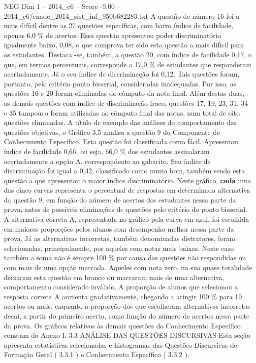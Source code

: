 \begin{textsample}{NEG Dim 1 – 2014\_c6 – Score -9.00 – 2014\_c6/enade\_2014\_sist\_inf\_950b682283.txt}
A questão de número 16 foi a mais difícil dentre as 27 questões específicas, com baixo índice de facilidade, apenas 6,0 \% de acertos.
Essa questão apresentou poder discriminatório igualmente baixo, 0,08, o que comprova ter sido esta questão a mais difícil para os estudantes.
Destaca -se, também, a questão 20, com índice de facilidade 0,17, o que, em termos percentuais, corresponde a 17,0 \% de estudantes que responderam acertadamente.
Já o seu índice de discriminação foi 0,12.
Tais questões foram, portanto, pelo critério ponto bisserial, consideradas inadequadas.
Por isso, as questões 16 e 20 foram eliminadas do cômputo da nota final.
Além destas duas, as demais questões com índice de discriminação fraco, questões 17, 19, 23, 31, 34 e 35 tampouco foram utilizadas no cômputo final das notas, num total de oito questões eliminadas.
A título de exemplo das análises do comportamento das questões objetivas, o Gráfico 3.5 analisa a questão 9 do Componente de Conhecimento Específico.
Esta questão foi classificada como fácil.
Apresentou índice de facilidade 0,66, ou seja, 66,0 \% dos estudantes assinalaram acertadamente a opção A, correspondente ao gabarito.
Seu índice de discriminação foi igual a 0,42, classificado como muito bom, também sendo esta questão a que apresentou o maior índice discriminatório.
Neste gráfico, \textbf{cada} uma das cinco curvas representa o percentual de respostas em determinada alternativa da questão 9, em função do número de acertos dos estudantes nessa parte da prova, antes de possíveis eliminações de questões pelo critério do ponto bisserial.
A alternativa correta A, representada no gráfico pela curva em azul, foi escolhida em maiores proporções pelos alunos com desempenho melhor nessa parte da prova.
Já as alternativas incorretas, também denominadas distratores, foram selecionadas, principalmente, por aqueles com notas mais baixas.
Neste caso também a soma não é sempre 100 \% por causa das questões não respondidas ou com mais de uma opção marcada.
Aqueles com nota zero, na sua quase totalidade deixaram esta questão em branco ou marcaram mais de uma alternativa, comportamento considerado inválido.
A proporção de alunos que selecionou a resposta correta A aumenta gradativamente, chegando a atingir 100 \% para 19 acertos ou mais, enquanto a proporção dos que escolheram alternativas incorretas decai, a partir do primeiro acerto, como função do número de acertos nessa parte da prova.
Os gráficos relativos às demais questões do Conhecimento Específico constam do Anexo I. 3.3 ANÁLISE DAS QUESTÕES DISCURSIVAS Esta seção apresenta estatísticas selecionadas e histogramas das Questões Discursivas de Formação Geral ( 3.3.1 ) e Conhecimento Específico ( 3.3.2 ).

\end{textsample}
